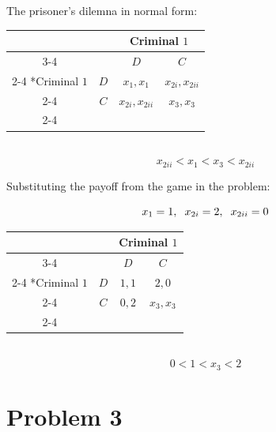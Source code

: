 \documentclass[a4paper,11pt]{article}
\begin{document}
The prisoner's dilemna in normal form:
\begin{table}[htbp]
  \setlength{\extrarowheight}{2pt}
  \begin{center}
  \begin{tabular}{*{4}{c|}}
    \multicolumn{2}{c}{} & \multicolumn{2}{c}{Criminal $1$}\\\cline{3-4}
    \multicolumn{1}{c}{}         &     &   $D$              &   $C$               \\\cline{2-4}
    \multirow{2}*{Criminal $1$}  & $D$ & $x_1,x_1$        & $x_{2i},x_{2ii}$  \\\cline{2-4}
                                 & $C$ & $x_{2i},x_{2ii}$ & $x_3,x_3$         \\\cline{2-4}
  \end{tabular}\\
  \[ x_{2ii} < x_1 < x_3 < x_{2ii} \]
  \end{center}
\end{table}


Substituting the payoff from the game in the problem:

\[ x_1 = 1, \hspace{2mm} x_{2i} = 2, \hspace{2mm} x_{2ii} = 0\]

\begin{table}[htbp]
  \setlength{\extrarowheight}{2pt}
  \begin{center}
  \begin{tabular}{*{4}{c|}}
    \multicolumn{2}{c}{} & \multicolumn{2}{c}{Criminal $1$}\\\cline{3-4}
    \multicolumn{1}{c}{}         &     &   $D$   &   $C$   \\\cline{2-4}
    \multirow{2}*{Criminal $1$}  & $D$ & $1,1$ & $2,0$ \\\cline{2-4}
                                 & $C$ & $0,2$ & $x_3,x_3$ \\\cline{2-4}
  \end{tabular}\\
  \[ 0 < 1 < x_3 < 2 \]
  \end{center}
\end{table}

\clearpage
\section*{Problem 3}
\end{document}
